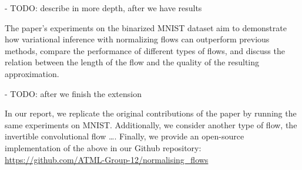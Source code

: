 

- TODO: describe in more depth, after we have results

The paper’s experiments on the binarized MNIST dataset aim to demonstrate how variational inference with normalizing flows can outperform previous methods, compare the performance of different types of flows, and discuss the relation between the length of the flow and the quality of the resulting approximation.

- TODO: after we finish the extension

In our report, we replicate the original contributions of the paper by running the same experiments on MNIST. Additionally, we consider another type of flow, the invertible convolutional flow …. Finally, we provide an open-source implementation of the above in our Github repository: 
\url{https://github.com/ATML-Group-12/normalising_flows}


